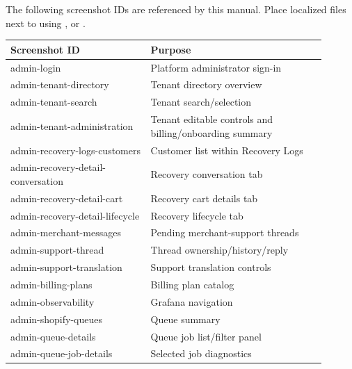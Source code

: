 The following screenshot IDs are referenced by this manual. Place localized files next to  using ,  or .

\begin{longtable}{P{0.40\linewidth}P{0.50\linewidth}}
\toprule
\textbf{Screenshot ID} & \textbf{Purpose}\\
\midrule
\endhead
admin-login & Platform administrator sign-in\\
admin-tenant-directory & Tenant directory overview\\
admin-tenant-search & Tenant search/selection\\
admin-tenant-administration & Tenant editable controls and billing/onboarding summary\\
admin-recovery-logs-customers & Customer list within Recovery Logs\\
admin-recovery-detail-conversation & Recovery conversation tab\\
admin-recovery-detail-cart & Recovery cart details tab\\
admin-recovery-detail-lifecycle & Recovery lifecycle tab\\
admin-merchant-messages & Pending merchant-support threads\\
admin-support-thread & Thread ownership/history/reply\\
admin-support-translation & Support translation controls\\
admin-billing-plans & Billing plan catalog\\
admin-observability & Grafana navigation\\
admin-shopify-queues & Queue summary\\
admin-queue-details & Queue job list/filter panel\\
admin-queue-job-details & Selected job diagnostics\\
\bottomrule
\end{longtable}
